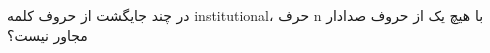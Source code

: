 \p    
در چند جایگشت از حروف کلمه
{\large institutional}،
حرف n با هیچ یک از حروف صدادار مجاور نیست؟

